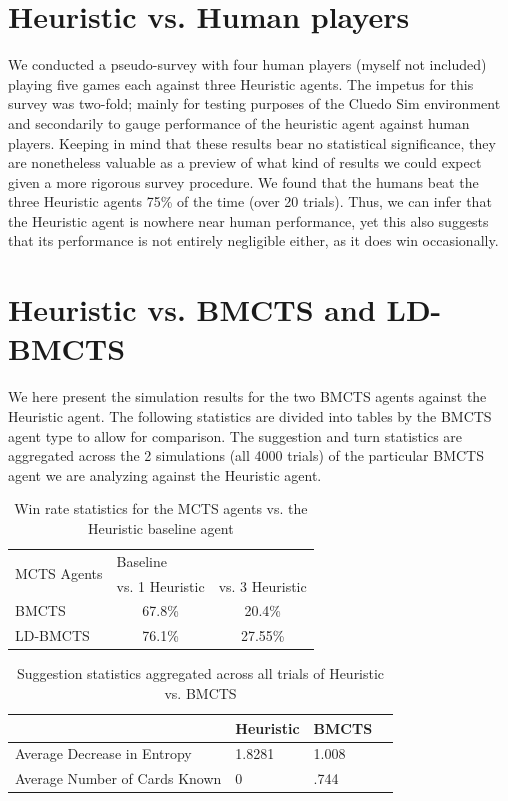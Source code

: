 \documentclass[msc, ai, twoside, notimes, logo, parskip, leftchapter, normalheadings]{infthesis}
\begin{document}
\section{Heuristic vs. Human players}
We conducted a pseudo-survey with four human players (myself not included) playing five games each against three Heuristic agents. The impetus for this survey was two-fold; mainly for testing purposes of the Cluedo Sim environment and secondarily to gauge performance of the heuristic agent against human players. Keeping in mind that these results bear no statistical significance, they are nonetheless valuable as a preview of what kind of results we could expect given a more rigorous survey procedure. We found that the humans beat the three Heuristic agents 75\% of the time (over 20 trials). Thus, we can infer that the Heuristic agent is nowhere near human performance, yet this also suggests that its performance is not entirely negligible either, as it does win occasionally.

\section{Heuristic vs. BMCTS and LD-BMCTS}
We here present the simulation results for the two BMCTS agents against the Heuristic agent. The following statistics are divided into tables by the BMCTS agent type to allow for comparison. The suggestion and turn statistics are aggregated across the 2 simulations (all 4000 trials) of the particular BMCTS agent we are analyzing against the Heuristic agent. 

\begin{table}[H]
\centering
\caption{Win rate statistics for the MCTS agents vs. the Heuristic baseline agent}
\begin{tabular}{l|llll}
\multirow{2}{*}{MCTS Agents} & \multicolumn{4}{l}{Baseline} \\ \cline{2-5} 
& \multicolumn{2}{l|}{vs. 1 Heuristic} & \multicolumn{2}{l}{vs. 3 Heuristic} \\ \hline \hline
BMCTS & \multicolumn{2}{c}{67.8\%} & \multicolumn{2}{c}{20.4\%} \\
LD-BMCTS & \multicolumn{2}{c}{76.1\%} & \multicolumn{2}{c}{27.55\%} 
\end{tabular}
\end{table}

\begin{table}[H]
\centering
\caption{Suggestion statistics aggregated across all trials of Heuristic vs. BMCTS}
\begin{tabular}{l|lll}
& \multicolumn{1}{l|}{Heuristic} & \multicolumn{1}{l|}{BMCTS}\\ \hline \hline
Average Decrease in Entropy & 1.8281 & 1.008 \\
Average Number of Cards Known & 0\footnotemark & .744 \\
\end{tabular}
\end{table}
\end{document}
